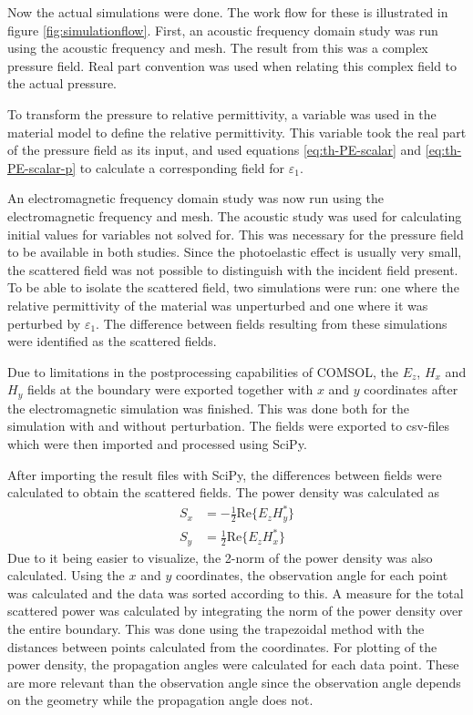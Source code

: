 \documentclass[11pt,twoside]{eitExjobb}
\begin{document}
	Now the actual simulations were done. The work flow for these is illustrated in figure \ref{fig:simulationflow}. First, an acoustic frequency domain study was run using the acoustic frequency and mesh. The result from this was a complex pressure field. Real part convention was used when relating this complex field to the actual pressure.
	
	To transform the pressure to relative permittivity, a variable was used in the material model to define the relative permittivity. This variable took the real part of the pressure field as its input, and used equations \eqref{eq:th-PE-scalar} and \eqref{eq:th-PE-scalar-p} to calculate a corresponding field for $\varepsilon_1$.
	
	An electromagnetic frequency domain study was now run using the electromagnetic frequency and mesh. The acoustic study was used for calculating initial values for variables not solved for. This was necessary for the pressure field to be available in both studies. Since the photoelastic effect is usually very small, the scattered field was not possible to distinguish with the incident field present. To be able to isolate the scattered field, two simulations were run: one where the relative permittivity of the material was unperturbed and one where it was perturbed by $\varepsilon_1$. The difference between fields resulting from these simulations were identified as the scattered fields.
	
	Due to limitations in the postprocessing capabilities of COMSOL, the $E_z$, $H_x$ and $H_y$ fields at the boundary were exported together with $x$ and $y$ coordinates after the electromagnetic simulation was finished. This was done both for the simulation with and without perturbation. The fields were exported to csv-files which were then imported and processed using SciPy.
	
	After importing the result files with SciPy, the differences between fields were calculated to obtain the scattered fields. The power density was calculated as
	\begin{align*}
		S_x &= -\frac{1}{2} \text{Re} \{ E_z H_y^* \} \\
		S_y &= \frac{1}{2} \text{Re} \{ E_z H_x^* \}
	\end{align*}
	Due to it being easier to visualize, the 2-norm of the power density was also calculated. Using the $x$ and $y$ coordinates, the observation angle for each point was calculated and the data was sorted according to this. A measure for the total scattered power was calculated by integrating the norm of the power density over the entire boundary. This was done using the trapezoidal method with the distances between points calculated from the coordinates. For plotting of the power density, the propagation angles were calculated for each data point. These are more relevant than the observation angle since the observation angle depends on the geometry while the propagation angle does not.
	
\end{document}
